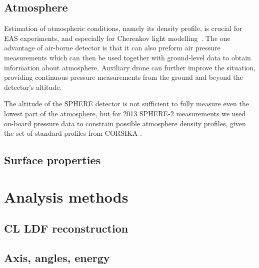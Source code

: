 \documentclass[a4paper,11pt]{article}
\begin{document}
\subsection{Atmosphere}

Estimation of atmospheric conditions, namely its density profile, is crucial for EAS experiments, and especially for Cherenkov light modelling~\cite{Bernlhr2000}. The one advantage of air-borne detector is that it can also preform air pressure measurements which can then be used together with ground-level data to obtain information about atmosphere. Auxiliary drone can further improve the situation, providing continuous pressure measurements from the ground and beyond the detector's altitude.

The altitude of the SPHERE detector is not sufficient to fully measure even the lowest part of the atmosphere, but for 2013 SPHERE-2 measurements we used on-board pressure data to constrain possible atmosphere density profiles, given the set of standard profiles from CORSIKA \citep{CORSIKA}.



\subsection{Surface properties}


\section{Analysis methods}
\subsection{CL LDF reconstruction}

\subsection{Axis, angles, energy}
\end{document}
